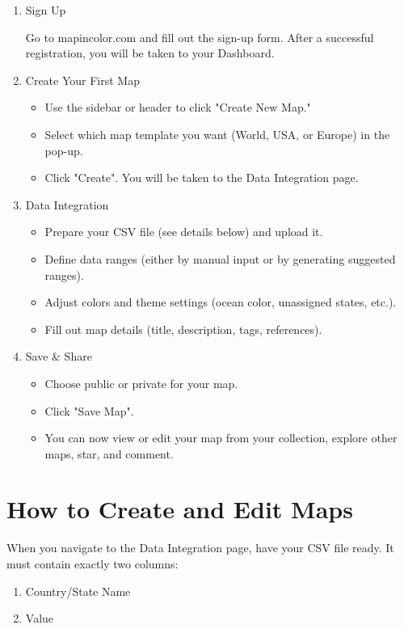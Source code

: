 \documentclass{article}
\begin{document}
\begin{enumerate}
  \item Sign Up

  Go to mapincolor.com and fill out the sign-up form. After a successful 
  registration, you will be taken to your Dashboard.

  \item Create Your First Map
  \begin{itemize}
  \item Use the sidebar or header to click "Create New Map."
  \item Select which map template you want (World, USA, or Europe) in the pop-up.
  \item Click "Create". You will be taken to the 
      Data Integration page.
  \end{itemize}

  \item Data Integration
  \begin{itemize}
  \item Prepare your CSV file (see details below) and upload it.
  \item Define data ranges (either by manual input or by generating suggested ranges).
  \item Adjust colors and theme settings (ocean color, unassigned states, etc.).
  \item Fill out map details (title, description, tags, references).
  \end{itemize}

  \item Save \& Share
  \begin{itemize}
  \item Choose public or private for your map.
  \item Click "Save Map".
  \item You can now view or edit your map from your collection, explore other 
      maps, star, and comment.
  \end{itemize}
\end{enumerate}

\section{How to Create and Edit Maps}

When you navigate to the Data Integration page, have your CSV file ready. 
It must contain exactly two columns:

\begin{enumerate}
  \item Country/State Name
  \item Value
\end{enumerate}
\end{document}
